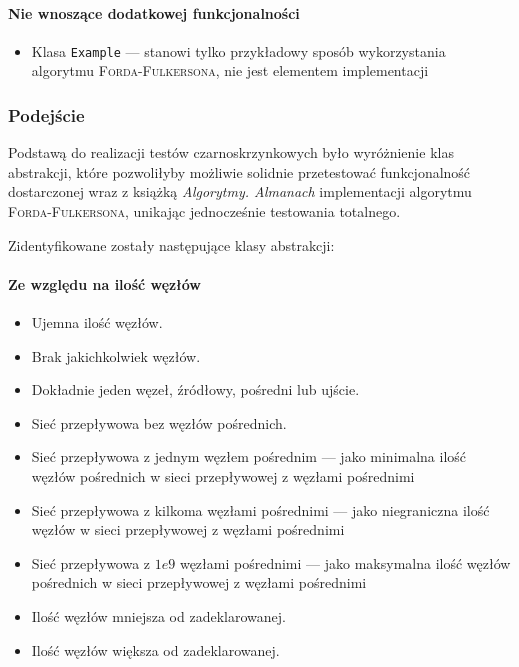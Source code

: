 \begin{itemize}[nosep]
\paragraph{Nie wnoszące dodatkowej funkcjonalności}
\begin{itemize}[nosep]
    \item Klasa \texttt{Example} --- stanowi tylko przykładowy sposób wykorzystania algorytmu \textsc{Forda-Fulkersona}, nie jest elementem implementacji%
\end{itemize}

\subsubsection{Podejście}%
Podstawą do realizacji testów czarno\dywiz skrzynkowych było wyróżnienie klas abstrakcji, które pozwoliłyby możliwie solidnie przetestować funkcjonalność dostarczonej wraz z książką \emph{Algorytmy. Almanach} implementacji algorytmu \textsc{Forda-Fulkersona}, unikając jednocześnie testowania totalnego.

Zidentyfikowane zostały następujące klasy abstrakcji:

\paragraph{Ze względu na ilość węzłów}
\begin{itemize}[nosep]
    \item Ujemna ilość węzłów.
    \item Brak jakichkolwiek węzłów.
    \item Dokładnie jeden węzeł, źródłowy, pośredni lub ujście.
    \item Sieć przepływowa bez węzłów pośrednich.
    \item Sieć przepływowa z jednym węzłem pośrednim --- jako minimalna ilość węzłów pośrednich w sieci przepływowej z węzłami pośrednimi
    \item Sieć przepływowa z kilkoma węzłami pośrednimi --- jako niegraniczna ilość węzłów w sieci przepływowej z węzłami pośrednimi
    \item Sieć przepływowa z $1e9$ węzłami pośrednimi --- jako maksymalna ilość węzłów pośrednich w sieci przepływowej z węzłami pośrednimi
    \item Ilość węzłów mniejsza od zadeklarowanej.
    \item Ilość węzłów większa od zadeklarowanej.
\end{itemize}


\end{itemize}

